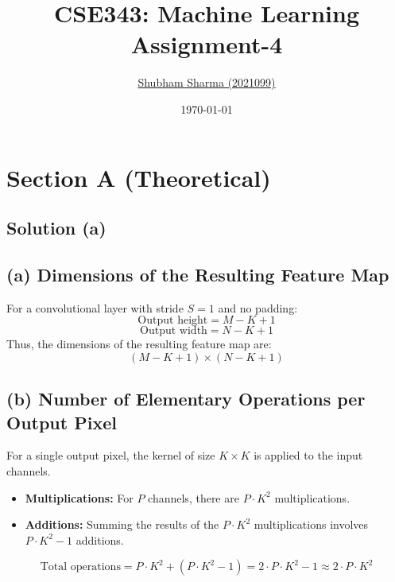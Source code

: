 \documentclass{article}
\title{
    \textbf{CSE343: Machine Learning} \\ \vspace*{-5pt}
    \textbf{\large{Assignment-4}}
}
\author{\href{mailto:shubham21099@iiitd.ac.in}{Shubham Sharma (2021099)}}
\date{\today}
\begin{document}
\maketitle


\section{Section A (Theoretical)}

\subsection*{Solution (a)}
\subsection*{(a) Dimensions of the Resulting Feature Map}
For a convolutional layer with stride \( S = 1 \) and no padding:
\[
\text{Output height} = M - K + 1
\]
\[
\text{Output width} = N - K + 1
\]
Thus, the dimensions of the resulting feature map are:
\[
(M - K + 1) \times (N - K + 1)
\]

\subsection*{(b) Number of Elementary Operations per Output Pixel}
For a single output pixel, the kernel of size \( K \times K \) is applied to the input channels.
\begin{itemize}
    \item \textbf{Multiplications:} For \( P \) channels, there are \( P \cdot K^2 \) multiplications.
    \item \textbf{Additions:} Summing the results of the \( P \cdot K^2 \) multiplications involves \( P \cdot K^2 - 1 \) additions.
\end{itemize}
\[
\text{Total operations} = P \cdot K^2 + (P \cdot K^2 - 1) = 2 \cdot P \cdot K^2 - 1 \approx 2 \cdot P \cdot K^2
\]
\end{document}
